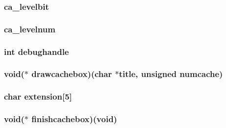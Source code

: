 \hypertarget{ID__CA_8H_af4f718356e28be31a81ef4df1a2f7c96}{
\subsubsection[{ca\_\-levelbit}]{ {\bf ca\_\-levelbit}}}
\label{ID__CA_8H_af4f718356e28be31a81ef4df1a2f7c96}
\hypertarget{ID__CA_8H_a2010805bcd6b7bda525f99d095cbf380}{
\subsubsection[{ca\_\-levelnum}]{ {\bf ca\_\-levelnum}}}
\label{ID__CA_8H_a2010805bcd6b7bda525f99d095cbf380}
\hypertarget{ID__CA_8H_a63f7bed9e587f57ce6912f20d2fb4f87}{
\subsubsection[{debughandle}]{\setlength{\rightskip}{0pt plus 5cm}int {\bf debughandle}}}
\label{ID__CA_8H_a63f7bed9e587f57ce6912f20d2fb4f87}
\hypertarget{ID__CA_8H_a95b0b2bbc1e3355c0a461efd1f569217}{
\subsubsection[{drawcachebox}]{\setlength{\rightskip}{0pt plus 5cm}void($\ast$ {\bf drawcachebox})(char $\ast$title, unsigned numcache)}}
\label{ID__CA_8H_a95b0b2bbc1e3355c0a461efd1f569217}
\hypertarget{ID__CA_8H_ab39923c10c51a08b6520566a47b307b5}{
\subsubsection[{extension}]{\setlength{\rightskip}{0pt plus 5cm}char {\bf extension}\mbox{[}5\mbox{]}}}
\label{ID__CA_8H_ab39923c10c51a08b6520566a47b307b5}
\hypertarget{ID__CA_8H_a0271eb601c69c0069697e3795a429ed6}{
\subsubsection[{finishcachebox}]{\setlength{\rightskip}{0pt plus 5cm}void($\ast$ {\bf finishcachebox})(void)}}
